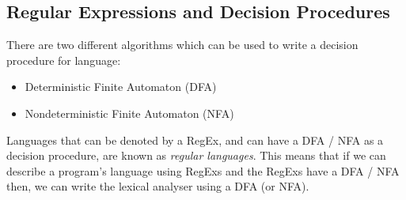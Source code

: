 \subsection{Regular Expressions and Decision Procedures}
There are two different algorithms which can be used to write a decision procedure for language:
\begin{itemize}
    \item Deterministic Finite Automaton (DFA)
    \item Nondeterministic Finite Automaton (NFA)
\end{itemize}
Languages that can be denoted by a RegEx, and can have a DFA / NFA as a decision procedure, are known as \textit{regular languages}. This means that  if we can describe a program's language using RegExs and the RegExs have a DFA / NFA then, we can write the lexical analyser using a DFA (or NFA). 